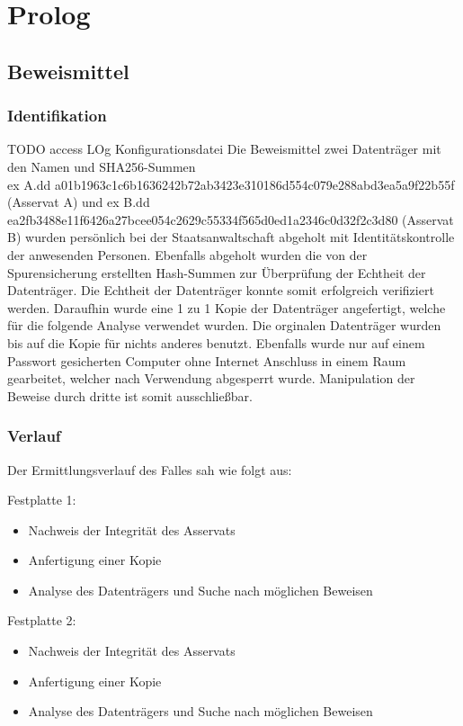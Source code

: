 \chapter{Prolog}

\section{Beweismittel}

\subsection{Identifikation}

TODO access LOg Konfigurationsdatei
Die Beweismittel zwei Datenträger mit den Namen und SHA256-Summen\\
ex A.dd a01b1963c1c6b1636242b72ab3423e310186d554c079e288abd3ea5a9f22b55f (Asservat A) und ex B.dd ea2fb3488e11f6426a27bcee054c2629c55334f565d0ed1a2346c0d32f2c3d80 (Asservat B) wurden persönlich bei der Staatsanwaltschaft abgeholt mit Identitätskontrolle der anwesenden Personen. Ebenfalls abgeholt wurden die von der Spurensicherung erstellten Hash-Summen zur Überprüfung der Echtheit der Datenträger. Die Echtheit der Datenträger konnte somit erfolgreich verifiziert werden. Daraufhin wurde eine 1 zu 1 Kopie der Datenträger angefertigt, welche für die folgende Analyse verwendet wurden. Die orginalen Datenträger wurden bis auf die Kopie für nichts anderes benutzt. Ebenfalls wurde nur auf einem Passwort gesicherten Computer ohne Internet Anschluss in einem Raum gearbeitet, welcher nach Verwendung abgesperrt wurde. Manipulation der Beweise durch dritte ist somit ausschließbar.

\subsection{Verlauf}
Der Ermittlungsverlauf des Falles sah wie folgt aus:

	Festplatte 1:
	\begin{itemize}
		\item Nachweis der Integrität des Asservats
		\item Anfertigung einer Kopie
		\item Analyse des Datenträgers und Suche nach möglichen Beweisen
	\end{itemize}

	Festplatte 2:
	\begin{itemize}
		\item Nachweis der Integrität des Asservats
		\item Anfertigung einer Kopie
		\item Analyse des Datenträgers und Suche nach möglichen Beweisen
	\end{itemize}

